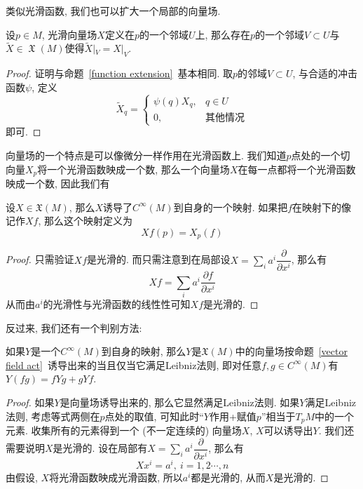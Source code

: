 类似光滑函数, 我们也可以扩大一个局部的向量场.
\begin{prop}[向量场扩充引理]\label{vector field extension}
    设$p\in M$, 光滑向量场$X$定义在$p$的一个邻域$U$上, 那么存在$p$的一个邻域$V\subset U$与$\widetilde{X}\in \mfrakX(M)$使得$\widetilde{X}|_V=X|_V$.
\end{prop}
\begin{proof}
    证明与命题~\ref{function extension}~基本相同.
    取$p$的邻域$V\subset U$, 与合适的冲击函数$\psi$, 定义
    \[\widetilde{X}_q=\begin{cases}
        \psi(q)X_q, & q\in U\\
        0, & \text{其他情况}
    \end{cases}\]
    即可.
\end{proof}

向量场的一个特点是可以像微分一样作用在光滑函数上.
我们知道$p$点处的一个切向量$X_p$将一个光滑函数映成一个数, 那么一个向量场$X$在每一点都将一个光滑函数映成一个数,
因此我们有
\begin{prop}\label{vector field act}
    设$X\in\mathfrak{X}(M)$, 那么$X$诱导了$C^\infty(M)$到自身的一个映射.
    如果把$f$在映射下的像记作$Xf$, 那么这个映射定义为
    \[Xf(p)=X_p(f)\]
\end{prop}
\begin{proof}
    只需验证$Xf$是光滑的.
    而只需注意到在局部设$\displaystyle X=\sum_{i}a^i\dfrac{\partial}{\partial x^i}$, 那么有
    \[Xf=\sum_{i}a^i\frac{\partial f}{\partial x^i}\]
    从而由$a^i$的光滑性与光滑函数的线性性可知$Xf$是光滑的.
\end{proof}
反过来, 我们还有一个判别方法:
\begin{prop}
    如果$Y$是一个$C^\infty(M)$到自身的映射, 那么$Y$是$\mathfrak{X}(M)$中的向量场按命题~\ref{vector field act}~诱导出来的当且仅当它满足Leibniz法则, 即对任意$f,g\in C^\infty(M)$有$Y(fg)=fYg+gYf$.
\end{prop}
\begin{proof}
    如果$Y$是向量场诱导出来的, 那么它显然满足Leibniz法则.
    如果$Y$满足Leibniz法则, 考虑等式两侧在$p$点处的取值, 可知此时``$Y$作用+赋值$p$''相当于$T_pM$中的一个元素.
    收集所有的元素得到一个 (不一定连续的) 向量场$X$, $X$可以诱导出$Y$.
    我们还需要说明$X$是光滑的.
    设在局部有$\displaystyle X=\sum_{i}a^i\dfrac{\partial}{\partial x^i}$, 那么有
    \[Xx^i=a^i,\ i=1,2\cdots,n\]
    由假设, $X$将光滑函数映成光滑函数, 所以$a^i$都是光滑的, 从而$X$是光滑的.
\end{proof}

